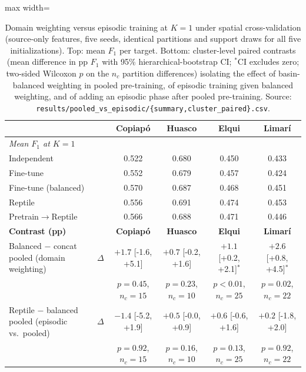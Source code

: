 \begin{table}[ht]
    \centering
    \caption{Domain weighting versus episodic training at $K=1$ under spatial cross-validation (source-only features, five seeds, identical partitions and support draws for all five initializations). Top: mean $F_1$ per target. Bottom: cluster-level paired contrasts (mean difference in pp $F_1$ with 95\% hierarchical-bootstrap CI; $^{*}$CI excludes zero; two-sided Wilcoxon $p$ on the $n_c$ partition differences) isolating the effect of basin-balanced weighting in pooled pre-training, of episodic training given balanced weighting, and of adding an episodic phase after pooled pre-training. Source: \texttt{results/pooled\_vs\_episodic/\{summary,cluster\_paired\}.csv}.}
    \label{tab:pooled_vs_episodic}
    \footnotesize
    \begin{adjustbox}{max width=\textwidth}
    \begin{tabular}{llcccc}
        \toprule
        & & \textbf{Copiap\'o} & \textbf{Huasco} & \textbf{Elqui} & \textbf{Limar\'i} \\
        \midrule
        \multicolumn{6}{l}{\textit{Mean $F_1$ at $K=1$}} \\
        Independent & & 0.522 & 0.680 & 0.450 & 0.433 \\
        Fine-tune & & 0.552 & 0.679 & 0.457 & 0.424 \\
        Fine-tune (balanced) & & 0.570 & 0.687 & 0.468 & 0.451 \\
        Reptile & & 0.556 & 0.691 & 0.474 & 0.453 \\
        Pretrain$\rightarrow$Reptile & & 0.566 & 0.688 & 0.471 & 0.446 \\
        \midrule
        \textbf{Contrast (pp)} & & \textbf{Copiap\'o} & \textbf{Huasco} & \textbf{Elqui} & \textbf{Limar\'i} \\
        \midrule
        Balanced $-$ concat pooled (domain weighting) & $\Delta$ & $+1.7$ [-1.6, +5.1] & $+0.7$ [-0.2, +1.6] & $+1.1$ [+0.2, +2.1]$^{*}$ & $+2.6$ [+0.8, +4.5]$^{*}$ \\
         & & \scriptsize $p=0.45$, $n_c=15$ & \scriptsize $p=0.23$, $n_c=10$ & \scriptsize $p<0.01$, $n_c=25$ & \scriptsize $p=0.02$, $n_c=22$ \\
        Reptile $-$ balanced pooled (episodic vs.\ pooled) & $\Delta$ & $-1.4$ [-5.2, +1.9] & $+0.5$ [-0.0, +0.9] & $+0.6$ [-0.6, +1.6] & $+0.2$ [-1.8, +2.0] \\
         & & \scriptsize $p=0.92$, $n_c=15$ & \scriptsize $p=0.16$, $n_c=10$ & \scriptsize $p=0.13$, $n_c=25$ & \scriptsize $p=0.92$, $n_c=22$ \\

\end{tabular}
\end{adjustbox}
\end{table}
